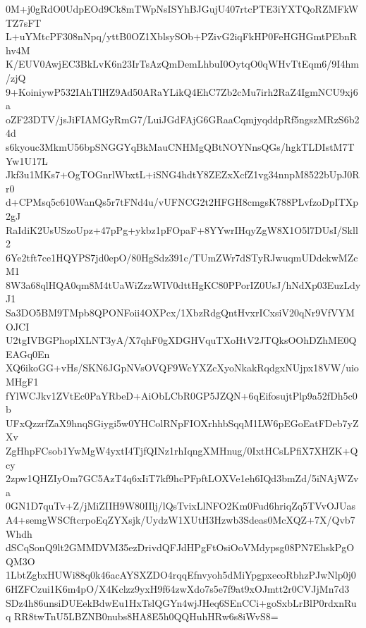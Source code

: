 0M+j0gRdO0UdpEOd9Ck8mTWpNsISYhBJGujU407rtcPTE3iYXTQoRZMFkWTZ7sFT
L+uYMtcPF308nNpq/yttB0OZ1XblsySOb+PZivG2iqFkHP0FeHGHGmtPEbnRhv4M
K/EUV0AwjEC3BkLvK6n23IrTsAzQmDemLhbuI0OytqO0qWHvTtEqm6/9I4hm/zjQ
9+KoiniywP532IAhTlHZ9Ad50ARaYLikQ4EhC7Zb2cMu7irh2RaZ4IgmNCU9xj6a
oZF23DTV/jsJiFIAMGyRmG7/LuiJGdFAjG6GRaaCqmjyqddpRf5ngszMRzS6b24d
s6kyouc3MkmU56bpSNGGYqBkMauCNHMgQBtNOYNnsQGs/hgkTLDIstM7TYw1U17L
Jkf3u1MKs7+OgTOGnrlWbxtL+iSNG4hdtY8ZEZxXcfZ1vg34nnpM8522bUpJ0Rr0
d+CPMsq5c610WanQs5r7tFNd4u/vUFNCG2t2HFGH8cmgsK788PLvfzoDpITXp2gJ
RaIdiK2UsUSzoUpz+47pPg+ykbz1pFOpaF+8YYwrIHqyZgW8X1O5l7DUsI/Skll2
6Ye2tft7ce1HQYPS7jd0epO/80HgSdz391c/TUmZWr7dSTyRJwuqmUDdckwMZcM1
8W3a68qlHQA0qm8M4tUaWiZzzWIV0dttHgKC80PPorIZ0UsJ/hNdXp03EuzLdyJ1
Sa3DO5BM9TMpb8QPONFoii4OXPcx/1XbzRdgQntHvxrICxsiV20qNr9VfVYMOJCI
U2tgIVBGPhoplXLNT3yA/X7qhF0gXDGHVquTXoHtV2JTQksOOhDZhME0QEAGq0En
XQ6ikoGG+vHs/SKN6JGpNVsOVQF9WcYXZcXyoNkakRqdgxNUjpx18VW/uioMHgF1
fYlWCJkv1ZVtEc0PaYRbeD+AiObLCbR0GP5JZQN+6qEifosujtPlp9a52fDh5c0b
UFxQzzrfZaX9hnqSGiygi5w0YHColRNpFIOXrhhbSqqM1LW6pEGoEatFDeb7yZXv
ZgHhpFCsob1YwMgW4yxtI4TjfQINz1rhIqngXMHnug/0IxtHCsLPfiX7XHZK+Qcy
2zpw1QHZIyOm7GC5AzT4q6xIiT7kf9hcPFpftLOXVe1eh6IQd3bmZd/5iNAjWZva
0GN1D7quTv+Z/jMiZIIH9W80IIlj/lQsTvixLlNFO2Km0Fud6hriqZq5TVvOJUas
A4+semgWSCftcrpoEqZYXsjk/UydzW1XUtH3Hzwb3Sdeas0McXQZ+7X/Qvb7Whdh
dSCqSonQ9lt2GMMDVM35ezDrivdQFJdHPgFtOsiOoVMdypsg08PN7EhskPgOQM3O
1LbtZgbxHUWi88q0k46acAYSXZDO4rqqEfnvyoh5dMiYpgpxecoRbhzPJwNlp0j0
6HZFCzui1K6m4pO/X4Kclzz9yxH9f64zwXdo7s5e7f9at9xOJmtt2r0CVJjMn7d3
SDz4h86unsiDUEekBdwEu1HxTslQGYn4wjJHeq6SEnCCi+goSxbLrBlP0rdxnRuq
RR8twTnU5LBZNB0nubs8HA8E5h0QQHuhHRw6s8iWvS8=

